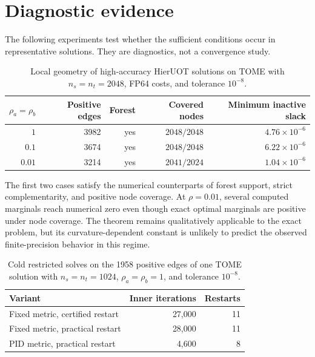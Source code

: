 \documentclass[11pt]{article}
\begin{document}
\section{Diagnostic evidence}

The following experiments test whether the sufficient conditions occur in representative solutions.
They are diagnostics, not a convergence study.

\begin{table}[ht]
\centering
\caption{Local geometry of high-accuracy HierUOT solutions on TOME with $n_s=n_t=2048$, FP64 costs, and tolerance $10^{-8}$.}
\begin{tabular}{rrrrr}
\toprule
$\rho_a=\rho_b$ & Positive edges & Forest & Covered nodes & Minimum inactive slack \\
\midrule
$1$ & 3982 & yes & $2048/2048$ & $4.76\times10^{-6}$ \\
$0.1$ & 3674 & yes & $2048/2048$ & $6.22\times10^{-6}$ \\
$0.01$ & 3214 & yes & $2041/2024$ & $1.04\times10^{-6}$ \\
\bottomrule
\end{tabular}
\end{table}

The first two cases satisfy the numerical counterparts of forest support, strict complementarity, and positive node coverage.
At $\rho=0.01$, several computed marginals reach numerical zero even though exact optimal marginals are positive under node coverage.
The theorem remains qualitatively applicable to the exact problem, but its curvature-dependent constant is unlikely to predict the observed finite-precision behavior in this regime.

\begin{table}[ht]
\centering
\caption{Cold restricted solves on the 1958 positive edges of one TOME solution with $n_s=n_t=1024$, $\rho_a=\rho_b=1$, and tolerance $10^{-8}$.}
\begin{tabular}{lrr}
\toprule
Variant & Inner iterations & Restarts \\
\midrule
Fixed metric, certified restart & 27,000 & 11 \\
Fixed metric, practical restart & 28,000 & 11 \\
PID metric, practical restart & 4,600 & 8 \\
\bottomrule
\end{tabular}
\end{table}
\end{document}
